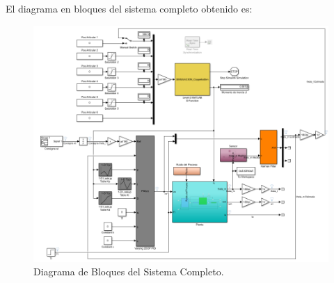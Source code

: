\documentclass{article}
\begin{document}
\begin{sloppypar}





El diagrama en bloques del sistema completo obtenido es:

\begin{figure}[H]
    \centering
    \includegraphics[width=1\textwidth]{Diagrama de Bloques del Sistema Completo}
    \caption{Diagrama de Bloques del Sistema Completo.}
    \label{fig:Diagrama de Bloques del Sistema Completo}
\end{figure}















\end{sloppypar}
\end{document}
